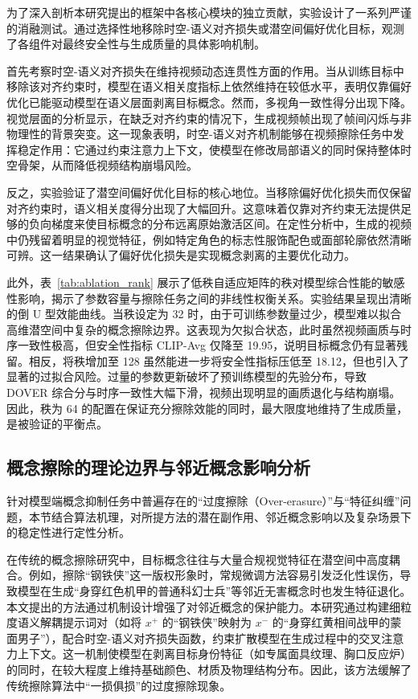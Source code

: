 为了深入剖析本研究提出的框架中各核心模块的独立贡献，实验设计了一系列严谨的消融测试。通过选择性地移除时空-语义对齐损失或潜空间偏好优化目标，观测了各组件对最终安全性与生成质量的具体影响机制。

首先考察时空-语义对齐损失在维持视频动态连贯性方面的作用。当从训练目标中移除该对齐约束时，模型在语义相关度指标上依然维持在较低水平，表明仅靠偏好优化已能驱动模型在语义层面剥离目标概念。然而，多视角一致性得分出现下降。视觉层面的分析显示，在缺乏对齐约束的情况下，生成视频帧出现了帧间闪烁与非物理性的背景突变。这一现象表明，时空-语义对齐机制能够在视频擦除任务中发挥稳定作用：它通过约束注意力上下文，使模型在修改局部语义的同时保持整体时空骨架，从而降低视频结构崩塌风险。

反之，实验验证了潜空间偏好优化目标的核心地位。当移除偏好优化损失而仅保留对齐约束时，语义相关度得分出现了大幅回升。这意味着仅靠对齐约束无法提供足够的负向梯度来使目标概念的分布远离原始激活区间。在定性分析中，生成的视频中仍残留着明显的视觉特征，例如特定角色的标志性服饰配色或面部轮廓依然清晰可辨。这一结果确认了偏好优化损失是实现概念剥离的主要优化动力。

此外，表~\ref{tab:ablation_rank} 展示了低秩自适应矩阵的秩对模型综合性能的敏感性影响，揭示了参数容量与擦除任务之间的非线性权衡关系。实验结果呈现出清晰的倒 U 型效能曲线。当秩设定为 32 时，由于可训练参数量过少，模型难以拟合高维潜空间中复杂的概念擦除边界。这表现为欠拟合状态，此时虽然视频画质与时序一致性极高，但安全性指标 CLIP-Avg 仅降至 19.95，说明目标概念仍有显著残留。相反，将秩增加至 128 虽然能进一步将安全性指标压低至 18.12，但也引入了显著的过拟合风险。过量的参数更新破坏了预训练模型的先验分布，导致 DOVER 综合分与时序一致性大幅下滑，视频出现明显的画质退化与结构崩塌。因此，秩为 64 的配置在保证充分擦除效能的同时，最大限度地维持了生成质量，是被验证的平衡点。


\subsection{概念擦除的理论边界与邻近概念影响分析}

针对模型端概念抑制任务中普遍存在的“过度擦除（Over-erasure）”与“特征纠缠”问题，本节结合算法机理，对所提方法的潜在副作用、邻近概念影响以及复杂场景下的稳定性进行定性分析。

在传统的概念擦除研究中，目标概念往往与大量合规视觉特征在潜空间中高度耦合。例如，擦除“钢铁侠”这一版权形象时，常规微调方法容易引发泛化性误伤，导致模型在生成“身穿红色机甲的普通科幻士兵”等邻近无害概念时也发生特征退化。本文提出的方法通过机制设计增强了对邻近概念的保护能力。本研究通过构建细粒度语义解耦提示词对（如将 $x^+$ 的“钢铁侠”映射为 $x^-$ 的“身穿红黄相间战甲的蒙面男子”），配合时空-语义对齐损失函数，约束扩散模型在生成过程中的交叉注意力上下文。这一机制使模型在剥离目标身份特征（如专属面具纹理、胸口反应炉）的同时，在较大程度上维持基础颜色、材质及物理结构分布。因此，该方法缓解了传统擦除算法中“一损俱损”的过度擦除现象。


